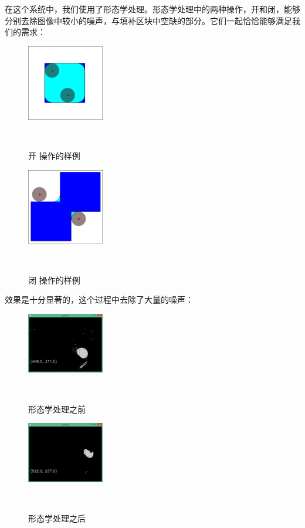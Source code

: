 在这个系统中，我们使用了形态学处理。形态学处理中的两种操作，开和闭，能够分别去除图像中较小的噪声，与填补区块中空缺的部分。它们一起恰恰能够满足我们的需求：\\
\begin{figure}[h]

  \centering
    \includegraphics[width=0.3\textwidth]{../Pictures/Opening.png}
    \caption{开 操作的样例\cite{cite7}}\\
\end{figure}
\begin{figure}[h]

  \centering
    \includegraphics[width=0.3\textwidth]{../Pictures/Closing.png}
    \caption{闭 操作的样例\cite{cite6}}\\
\end{figure}

效果是十分显著的，这个过程中去除了大量的噪声：\\
\begin{figure}[h]

  \centering
    \includegraphics[width=0.3\textwidth]{../Pictures/before.png}
    \caption{形态学处理之前}\\
\end{figure}
\begin{figure}[h!]

  \centering
    \includegraphics[width=0.3\textwidth]{../Pictures/after.png}
    \caption{形态学处理之后}\\
\end{figure}

